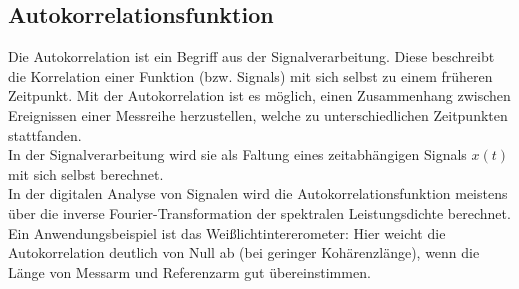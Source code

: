 \subsection{Autokorrelationsfunktion}
Die Autokorrelation ist ein Begriff aus der Signalverarbeitung. 
Diese beschreibt die Korrelation einer Funktion (bzw. Signals) mit sich 
selbst zu einem früheren Zeitpunkt. 
Mit der Autokorrelation ist es möglich, einen Zusammenhang 
zwischen Ereignissen einer Messreihe herzustellen, welche zu unterschiedlichen
Zeitpunkten stattfanden. \\
In der Signalverarbeitung wird sie als Faltung eines 
zeitabhängigen Signals $x(t)$ mit sich selbst berechnet.\\
In der digitalen Analyse von Signalen wird die Autokorrelationsfunktion
meistens über die inverse Fourier-Transformation der 
spektralen Leistungsdichte berechnet.\\
Ein Anwendungsbeispiel ist das Weißlichtintererometer:
Hier weicht die Autokorrelation deutlich von Null ab (bei geringer Kohärenzlänge), wenn 
die Länge von Messarm und Referenzarm gut übereinstimmen.
\citep[vgl.][]{Zusatzliteratur}


